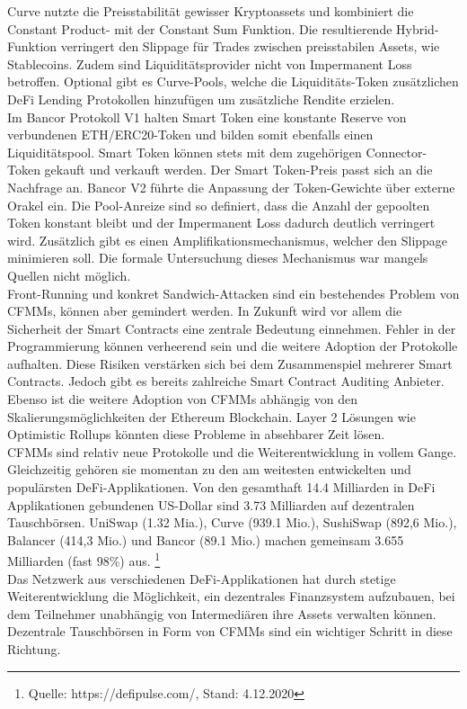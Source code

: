 \documentclass[12pt,a4paper,titlepage,oneside,english]{article}
\begin{document}
Curve nutzte die Preisstabilität gewisser Kryptoassets und kombiniert die Constant Product- mit der Constant Sum Funktion. Die resultierende Hybrid-Funktion verringert den Slippage für Trades zwischen preisstabilen Assets, wie Stablecoins. Zudem sind Liquiditätsprovider nicht von Impermanent Loss betroffen. Optional gibt es Curve-Pools, welche die Liquiditäts-Token zusätzlichen DeFi Lending Protokollen hinzufügen um zusätzliche Rendite erzielen. \\
Im Bancor Protokoll V1 halten Smart Token eine konstante Reserve von verbundenen ETH/ERC20-Token und bilden somit ebenfalls einen Liquiditätspool. Smart Token können stets mit dem zugehörigen Connector-Token gekauft und verkauft werden. Der Smart Token-Preis passt sich an die Nachfrage an. %
Bancor V2 führte die Anpassung der Token-Gewichte über externe Orakel ein. Die Pool-Anreize sind so definiert, dass die Anzahl der gepoolten Token konstant bleibt und der Impermanent Loss dadurch deutlich verringert wird. Zusätzlich gibt es einen Amplifikationsmechanismus, welcher den Slippage minimieren soll. Die formale Untersuchung dieses Mechanismus war mangels Quellen nicht möglich. \\
Front-Running und konkret Sandwich-Attacken sind ein bestehendes Problem von CFMMs, können aber gemindert werden. %
In Zukunft wird vor allem die Sicherheit der Smart Contracts eine zentrale Bedeutung einnehmen. Fehler in der Programmierung können verheerend sein und die weitere Adoption der Protokolle aufhalten. Diese Risiken verstärken sich bei dem Zusammenspiel mehrerer Smart Contracts. Jedoch gibt es bereits zahlreiche Smart Contract Auditing Anbieter. Ebenso ist die weitere Adoption von CFMMs abhängig von den Skalierungsmöglichkeiten der Ethereum Blockchain. Layer 2 Lösungen wie Optimistic Rollups könnten diese Probleme in absehbarer Zeit lösen.\\
CFMMs sind relativ neue Protokolle und die Weiterentwicklung in vollem Gange. Gleichzeitig gehören sie momentan zu den am weitesten entwickelten und populärsten DeFi-Applikationen. Von den gesamthaft 14.4 Milliarden in DeFi Applikationen gebundenen US-Dollar sind 3.73 Milliarden auf dezentralen Tauschbörsen. UniSwap (1.32 Mia.), Curve (939.1 Mio.), SushiSwap (892,6 Mio.), Balancer (414,3 Mio.) und Bancor (89.1 Mio.) machen gemeinsam 3.655 Milliarden (fast 98\%) aus. \footnote{Quelle: https://defipulse.com/, Stand: 4.12.2020}  \\
Das Netzwerk aus verschiedenen DeFi-Applikationen hat durch stetige Weiterentwicklung die Möglichkeit, ein dezentrales Finanzsystem aufzubauen, bei dem Teilnehmer unabhängig von Intermediären ihre Assets verwalten können. Dezentrale Tauschbörsen in Form von CFMMs sind ein wichtiger Schritt in diese Richtung.
\end{document}
